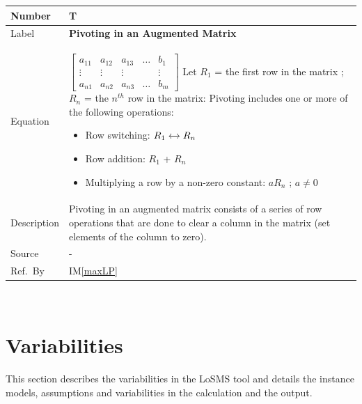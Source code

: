 \documentclass[12pt]{article}
\newcommand{\colAwidth}{0.13\textwidth}
\newcommand{\colBwidth}{0.82\textwidth}
\newcounter{theorynum} %
\newcommand{\iref}[1]{IM\ref{#1}}
\newcommand{\famname}{LoSMS} %
\begin{document}
\noindent
\begin{minipage}{\textwidth}
	\renewcommand*{\arraystretch}{1.5}
	\begin{tabular}{| p{\colAwidth} | p{\colBwidth}|}
		\hline
		\rowcolor[gray]{0.9}
		Number& T{theorynum}\thetheorynum \label{T_pivoting}\\
		\hline
		Label&\bf Pivoting in an Augmented Matrix\\
		\hline
		Equation&$\begin{bmatrix}
		a_{11} & a_{12} & a_{13} & \dots & b_{1}\\
		\vdots & \vdots & \vdots & &\vdots\\
		a_{n1} & a_{n2} & a_{n3} & \dots & b_{m}	
		\end{bmatrix}$ \newline \newline
		Let $R_1$ = the first row in the matrix ; $R_n$ = the $n^{th}$ row in 
		the matrix: \newline
		Pivoting includes one or more of the following operations: \newline
		\begin{itemize}
			\item Row switching: $R_1 \xleftrightarrow{} R_n$
			
			\item Row addition: $R_1$ + $R_n$
			
			\item Multiplying a row by a non-zero constant: $aR_n$ ; 
			$a \neq 0$
		\end{itemize} \\
		\hline
		Description & 
		Pivoting in an augmented matrix consists of a series of row operations 
		that are done to clear a column in the matrix (set elements of the 
		column to zero).\\
		\hline
		Source & -\\
		\hline
		Ref.\ By & \iref{maxLP}\\
		\hline
	\end{tabular}
\end{minipage}\\

\section{Variabilities} \label{Sec_Variabilities} 

This section describes the variabilities in the \famname{} tool and details the 
instance models, assumptions and variabilities in the calculation and the 
output.
\end{document}
